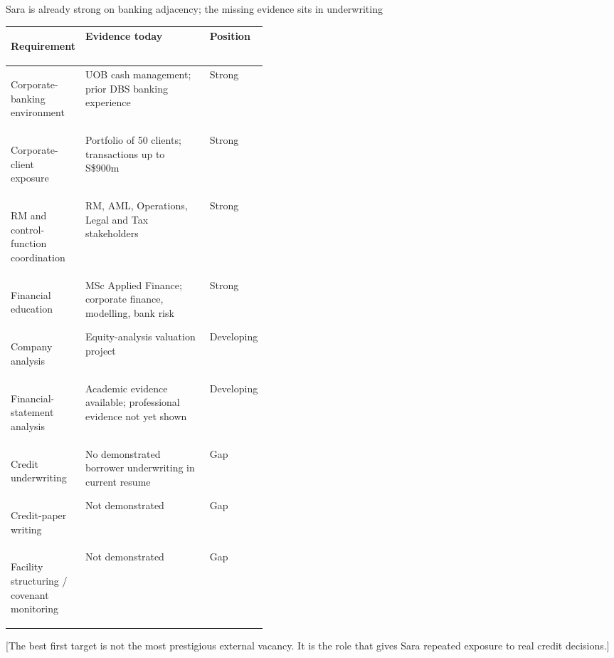 \documentclass[theme=editorial,publication-type=feature-article]{reportkit}
\begin{document}
\begin{featureexhibit}[span=full]{Sara is already strong on banking adjacency; the missing evidence sits in underwriting}
\begin{featuretable}
\begin{tabularx}{\linewidth}{>{\bfseries\raggedright\arraybackslash}p{0.24\linewidth} >{\raggedright\arraybackslash}X >{\raggedright\arraybackslash}p{0.18\linewidth}}
Requirement & Evidence today & Position \\
\hline
Corporate-banking environment & UOB cash management; prior DBS banking experience & Strong \\
Corporate-client exposure & Portfolio of 50 clients; transactions up to S\$900m & Strong \\
RM and control-function coordination & RM, AML, Operations, Legal and Tax stakeholders & Strong \\
Financial education & MSc Applied Finance; corporate finance, modelling, bank risk & Strong \\
Company analysis & Equity-analysis valuation project & Developing \\
Financial-statement analysis & Academic evidence available; professional evidence not yet shown & Developing \\
Credit underwriting & No demonstrated borrower underwriting in current resume & Gap \\
Credit-paper writing & Not demonstrated & Gap \\
Facility structuring / covenant monitoring & Not demonstrated & Gap \\
\end{tabularx}
\end{featuretable}
\end{featureexhibit}

[The best first target is not the most prestigious external vacancy. It is the role that gives Sara repeated exposure to real credit decisions.]
\end{document}
